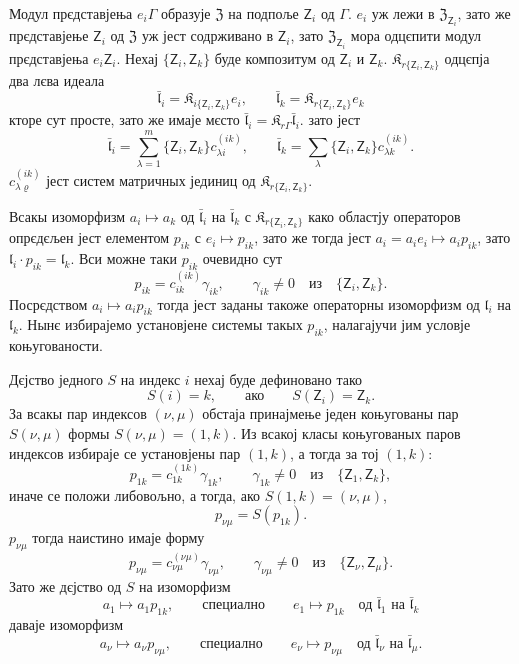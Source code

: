 \documentclass[11pt]{article}
\begin{document}
Модул прєдставјења \(e_i\Gamma\) образује \(\mathfrak Z\) на подпоље \(\mathsf{Z}_i\) од \(\Gamma\). \(e_i\) уж лежи в \(\mathfrak Z_{\mathsf{Z}_i}\), зато же прєдставјење \(\mathsf{Z}_i\) од \(\mathfrak Z\) уж јест содрживано в \(\mathsf{Z}_i\), зато \(\mathfrak Z_{\mathsf{Z}_i}\) мора одцєпити модул прєдставјења \(e_i\mathsf{Z}_i\). Нехај \(\{\mathsf{Z}_i,\mathsf{Z}_k\}\) буде композитум од \(\mathsf{Z}_i\) и \(\mathsf{Z}_k\). \(\mathfrak K_{r\{\mathsf{Z}_i,\mathsf{Z}_k\}}\) одцєпја два лєва идеала
\[
\bar{\mathfrak l}_i=\mathfrak K_{i\{\mathsf{Z}_i,\mathsf{Z}_k\}}e_i,\qquad
\bar{\mathfrak l}_k=\mathfrak K_{r\{\mathsf{Z}_i,\mathsf{Z}_k\}}e_k
\]
кторе сут просте, зато же имаје мєсто \(\bar{\mathfrak l}_i=\mathfrak K_{r\Gamma}\bar{\mathfrak l}_i\). зато јест
\[
\bar{\mathfrak l}_i=\sum_{\lambda=1}^m\{\mathsf{Z}_i,\mathsf{Z}_k\}c_{\lambda i}^{(ik)},\qquad
\bar{\mathfrak l}_k=\sum_{\lambda}\{\mathsf{Z}_i,\mathsf{Z}_k\}c_{\lambda k}^{(ik)}.
\]
\(c_{\lambda\varrho}^{(ik)}\) јест систем матричных јединиц од \(\mathfrak K_{r\{\mathsf{Z}_i,\mathsf{Z}_k\}}\).

Всакы изоморфизм \(a_i\mapsto a_k\) од \(\bar{\mathfrak l}_i\) на \(\bar{\mathfrak l}_k\) с \(\mathfrak K_{r\{\mathsf{Z}_i,\mathsf{Z}_k\}}\) како областју операторов опрєдєљен јест елементом \(p_{ik}\) с \(e_i\mapsto p_{ik}\), зато же тогда јест \(a_i=a_ie_i\mapsto a_ip_{ik}\), зато \(\mathfrak l_i\cdot p_{ik}=\mathfrak l_k\). Вси можне таки \(p_{ik}\) очевидно сут
\[
p_{ik}=c_{ik}^{(ik)}\gamma_{ik},\qquad \gamma_{ik}\ne0\quad\text{из}\quad \{\mathsf{Z}_i,\mathsf{Z}_k\}.
\]
Посрєдством \(a_i\mapsto a_ip_{ik}\) тогда јест заданы такоже операторны изоморфизм од \(\mathfrak l_i\) на \(\mathfrak l_k\). Нынє избирајемо установјене системы такых \(p_{ik}\), налагајучи јим условје коњугованости.

Дєјство једного \(S\) на индекс \(i\) нехај буде дефиновано тако
\[
S(i)=k,\qquad\text{ако}\qquad S(\mathsf{Z}_i)=\mathsf{Z}_k.
\]
За всакы пар индексов \((\nu,\mu)\) обстаја принајмење једен коњугованы пар \(S(\nu,\mu)\) формы \(S(\nu,\mu)=(1,k)\). Из всакој класы коњугованых паров индексов избираје се установјены пар \((1,k)\), а тогда за тој \((1,k)\):
\[
p_{1k}=c_{1k}^{(1k)}\gamma_{1k},\qquad \gamma_{1k}\ne0\quad\text{из}\quad \{\mathsf{Z}_1,\mathsf{Z}_k\},
\]
иначе се положи либовољно, а тогда, ако \(S(1,k)=(\nu,\mu)\),
\[
p_{\nu\mu}=S(p_{1k}).
\]
\(p_{\nu\mu}\) тогда наистино имаје форму
\[
p_{\nu\mu}=c_{\nu\mu}^{(\nu\mu)}\gamma_{\nu\mu},\qquad
\gamma_{\nu\mu}\ne0\quad\text{из}\quad \{\mathsf{Z}_\nu,\mathsf{Z}_\mu\}.
\]
Зато же дєјство од \(S\) на изоморфизм
\[
a_1\mapsto a_1p_{1k},\qquad\text{специално}\qquad e_1\mapsto p_{1k}
\quad\text{од }\bar{\mathfrak l}_1\text{ на }\bar{\mathfrak l}_k
\]
даваје изоморфизм
\[
a_\nu\mapsto a_\nu p_{\nu\mu},\qquad\text{специално}\qquad e_\nu\mapsto p_{\nu\mu}
\quad\text{од }\bar{\mathfrak l}_\nu\text{ на }\bar{\mathfrak l}_\mu.
\]
\end{document}
